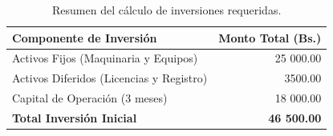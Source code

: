 \begin{table}[htbp]
    \centering
    \caption{Resumen del cálculo de inversiones requeridas.}
    \label{tab:inversiones_requeridas}
    \begin{tabular}{lr}
        \toprule
        \textbf{Componente de Inversión} & \textbf{Monto Total (Bs.)} \\
        \midrule
        Activos Fijos (Maquinaria y Equipos) & 25 000.00 \\
        Activos Diferidos (Licencias y Registro) & 3500.00 \\
        Capital de Operación (3 meses)      & 18 000.00 \\
        \midrule
        \textbf{Total Inversión Inicial}     & \textbf{46 500.00} \\
        \bottomrule
    \end{tabular}
\end{table}
